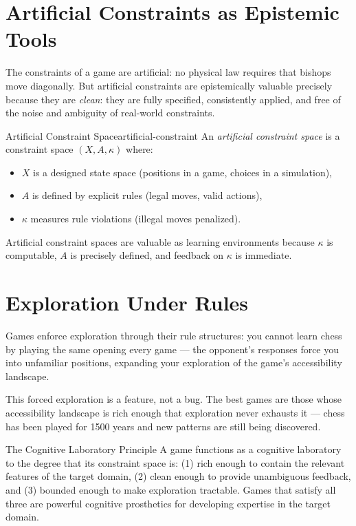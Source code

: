\section{Artificial Constraints as Epistemic Tools}

The constraints of a game are artificial: no physical law requires
that bishops move diagonally. But artificial constraints are epistemically
valuable precisely because they are \emph{clean}: they are fully specified,
consistently applied, and free of the noise and ambiguity of real-world
constraints.

\begin{definition}{Artificial Constraint Space}{artificial-constraint}
  An \emph{artificial constraint space} is a constraint space
  $(X, A, \kappa)$ where:
  \begin{itemize}
    \item $X$ is a designed state space (positions in a game, choices
          in a simulation),
    \item $A$ is defined by explicit rules (legal moves, valid actions),
    \item $\kappa$ measures rule violations (illegal moves penalized).
  \end{itemize}
  Artificial constraint spaces are valuable as learning environments
  because $\kappa$ is computable, $A$ is precisely defined, and
  feedback on $\kappa$ is immediate.
\end{definition}

\section{Exploration Under Rules}

Games enforce exploration through their rule structures: you cannot
learn chess by playing the same opening every game — the opponent's
responses force you into unfamiliar positions, expanding your
exploration of the game's accessibility landscape.

This forced exploration is a feature, not a bug. The best games are
those whose accessibility landscape is rich enough that exploration
never exhausts it — chess has been played for 1500 years and new
patterns are still being discovered.

\begin{namedthm}{The Cognitive Laboratory Principle}
  A game functions as a cognitive laboratory to the degree that
  its constraint space is: (1) rich enough to contain the relevant
  features of the target domain, (2) clean enough to provide
  unambiguous feedback, and (3) bounded enough to make exploration
  tractable. Games that satisfy all three are powerful cognitive
  prosthetics for developing expertise in the target domain.
\end{namedthm}

